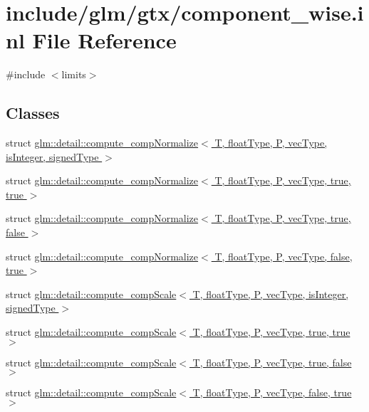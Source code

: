 \hypertarget{component__wise_8inl}{}\section{include/glm/gtx/component\+\_\+wise.inl File Reference}
\label{component__wise_8inl}
{\ttfamily \#include $<$limits$>$}\newline
\subsection*{Classes}
\begin{DoxyCompactItemize}
\item 
struct \hyperlink{structglm_1_1detail_1_1compute__compNormalize}{glm\+::detail\+::compute\+\_\+comp\+Normalize$<$ T, float\+Type, P, vec\+Type, is\+Integer, signed\+Type $>$}
\item 
struct \hyperlink{structglm_1_1detail_1_1compute__compNormalize_3_01T_00_01floatType_00_01P_00_01vecType_00_01true_00_01true_01_4}{glm\+::detail\+::compute\+\_\+comp\+Normalize$<$ T, float\+Type, P, vec\+Type, true, true $>$}
\item 
struct \hyperlink{structglm_1_1detail_1_1compute__compNormalize_3_01T_00_01floatType_00_01P_00_01vecType_00_01true_00_01false_01_4}{glm\+::detail\+::compute\+\_\+comp\+Normalize$<$ T, float\+Type, P, vec\+Type, true, false $>$}
\item 
struct \hyperlink{structglm_1_1detail_1_1compute__compNormalize_3_01T_00_01floatType_00_01P_00_01vecType_00_01false_00_01true_01_4}{glm\+::detail\+::compute\+\_\+comp\+Normalize$<$ T, float\+Type, P, vec\+Type, false, true $>$}
\item 
struct \hyperlink{structglm_1_1detail_1_1compute__compScale}{glm\+::detail\+::compute\+\_\+comp\+Scale$<$ T, float\+Type, P, vec\+Type, is\+Integer, signed\+Type $>$}
\item 
struct \hyperlink{structglm_1_1detail_1_1compute__compScale_3_01T_00_01floatType_00_01P_00_01vecType_00_01true_00_01true_01_4}{glm\+::detail\+::compute\+\_\+comp\+Scale$<$ T, float\+Type, P, vec\+Type, true, true $>$}
\item 
struct \hyperlink{structglm_1_1detail_1_1compute__compScale_3_01T_00_01floatType_00_01P_00_01vecType_00_01true_00_01false_01_4}{glm\+::detail\+::compute\+\_\+comp\+Scale$<$ T, float\+Type, P, vec\+Type, true, false $>$}
\item 
struct \hyperlink{structglm_1_1detail_1_1compute__compScale_3_01T_00_01floatType_00_01P_00_01vecType_00_01false_00_01true_01_4}{glm\+::detail\+::compute\+\_\+comp\+Scale$<$ T, float\+Type, P, vec\+Type, false, true $>$}
\end{DoxyCompactItemize}
